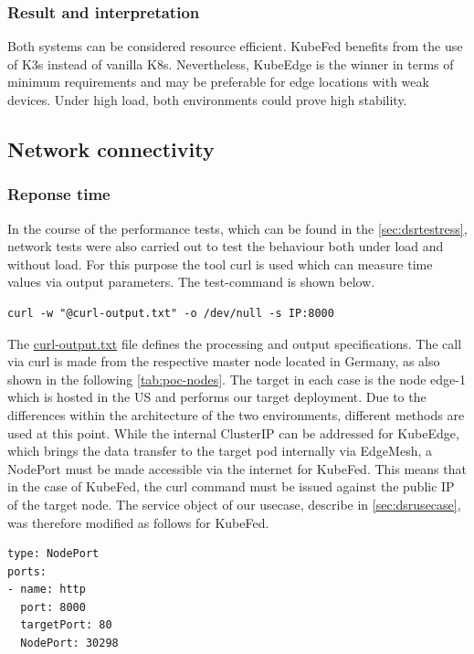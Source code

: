 \documentclass[MSC,Master,english]{twbook}%
\begin{document}
\subsubsection{Result and interpretation} 
Both systems can be considered resource efficient. KubeFed benefits from the use of K3s instead of vanilla K8s. Nevertheless, KubeEdge is the winner in terms of minimum requirements and may be preferable for edge locations with weak devices. Under high load, both environments could prove high stability.

\subsection{Network connectivity}
\label{sec:dsrtestnetwork}
\subsubsection{Reponse time}
In the course of the performance tests, which can be found in the \autoref{sec:dsrtestress}, network tests were also carried out to test the behaviour both under load and without load. For this purpose the tool curl is used which can measure time values via output parameters. The test-command is shown below.

\begin{lstlisting}[caption={Curl command},captionpos=b]
curl -w "@curl-output.txt" -o /dev/null -s IP:8000
\end{lstlisting}

The \hyperref{https://github.com/Berndinox/K8sEdge/blob/main/Tests/network/curl.md}{}{}{curl-output.txt}\cite{bk-gh-curl} file defines the processing and output specifications. The call via curl is made from the respective master node located in Germany, as also shown in the following \autoref{tab:poc-nodes}. The target in each case is the node edge-1 which is hosted in the US and performs our target deployment. Due to the differences within the architecture of the two environments, different methods are used at this point. While the internal ClusterIP can be addressed for KubeEdge, which brings the data transfer to the target pod internally via EdgeMesh, a NodePort must be made accessible via the internet for KubeFed. This means that in the case of KubeFed, the curl command must be issued against the public IP of the target node. The service object of our usecase, describe in \autoref{sec:dsrusecase}, was therefore modified as follows for KubeFed.

\begin{lstlisting}[caption={Curl command},captionpos=b]
type: NodePort
ports:
- name: http
  port: 8000
  targetPort: 80
  NodePort: 30298
\end{lstlisting}
\end{document}
